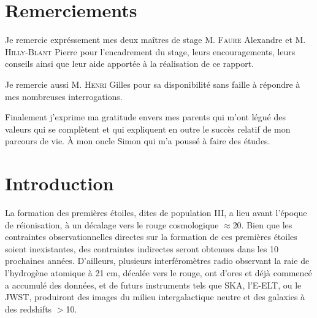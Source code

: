 \documentclass[10pt, a4paper]{report}
\numberwithin{equation}{subsection}
\begin{document}
\renewcommand{\contentsname}{Sommaire}
\renewcommand{\bibname}{Références}



\tableofcontents


\section*{Remerciements}
Je remercie expréssement mes deux maîtres de stage M. \textsc{Faure} Alexandre et M. \textsc{Hilly-Blant} Pierre pour l'encadrement du stage, leurs encouragements, leurs conseils ainsi que leur aide apportée à la réalisation de ce rapport.

Je remercie aussi M. \textsc{Henri} Gilles pour sa disponibilité sans faille à répondre à mes nombreuses interrogations.

Finalement j'exprime ma gratitude envers mes parents qui m'ont légué des valeurs qui se complètent et qui expliquent en outre le succès relatif de mon parcours de vie. À mon oncle Simon qui m'a poussé à faire des études.
 

\section*{Introduction}
La formation des premières étoiles, dites de population III, a lieu avant l'époque de réionisation, à un décalage vers le rouge cosmologique $\approx$20. Bien que les contraintes observationnelles directes sur la formation de ces premières étoiles soient inexistantes, des contraintes indirectes seront obtenues dans les 10 prochaines années. D'ailleurs, plusieurs interféromètres radio observant la raie de l'hydrogène atomique à 21 cm, décalée vers le rouge, ont d'ores et déjà commencé a accumulé des données, et de futurs instruments tels que SKA, l'E-ELT, ou le JWST, produiront des images du milieu intergalactique neutre et des galaxies à des redshifts $>$10.
\end{document}
